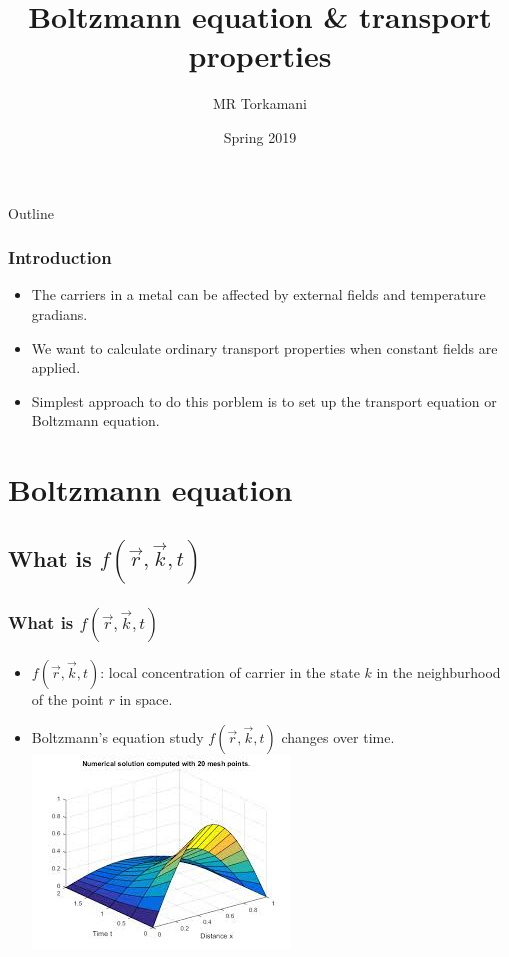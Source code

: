 \documentclass{beamer}
\title{Boltzmann equation \& transport properties}
\author{MR Torkamani}
\institute{Kharazmi university}
\date{Spring 2019}
\begin{document}
\begin{frame}
\titlepage
\end{frame}
\begin{frame}[allowframebreaks]{Outline}
  \tableofcontents[sections={1-2}]
    \framebreak
  \tableofcontents[sections={3-5}]
\end{frame}
\begin{frame}
\frametitle{Introduction}
\begin{itemize}
\item The carriers in a metal can be affected by external fields and temperature gradians.
\pause
\item We want to calculate ordinary transport properties when constant fields are applied.
\pause
\item Simplest approach to do this porblem is to set up the transport equation or Boltzmann equation.
\end{itemize}
\end{frame}
\section{Boltzmann equation}
\subsection{What is $f (\vec{r},\vec{k},t)$}
\begin{frame}
\frametitle{What is $f (\vec{r},\vec{k},t)$}
\begin{itemize}
\item $f (\vec{r},\vec{k},t)$: local concentration of carrier in the state $k$ in the neighburhood of the point $r$ in space.
\pause
\item Boltzmann's equation study $f (\vec{r},\vec{k},t)$ changes over time.
\pause
\includegraphics[scale=.7]{boltzmann}
\end{itemize}
\end{frame}
\end{document}
